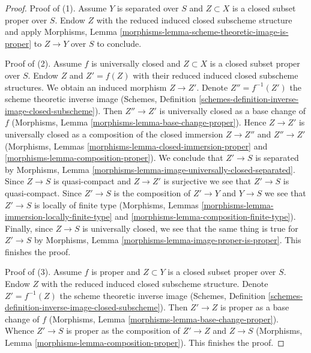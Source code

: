 \documentclass[10pt,a4paper]{amsart}
\theoremstyle{plain}
\theoremstyle{definition}
\theoremstyle{remark}
\numberwithin{equation}{subsection}
\begin{document}
\begin{proof}
Proof of (1). Assume $Y$ is separated over $S$ and $Z \subset X$
is a closed subset proper over $S$. Endow $Z$ with the reduced induced
closed subscheme structure and apply
Morphisms, Lemma \ref{morphisms-lemma-scheme-theoretic-image-is-proper}
to $Z \to Y$ over $S$ to conclude.

\medskip\noindent
Proof of (2). Assume $f$ is universally closed and $Z \subset X$ is a
closed subset proper over $S$. Endow $Z$ and $Z' = f(Z)$ with their reduced
induced closed subscheme structures. We obtain an induced
morphism $Z \to Z'$.
Denote $Z'' = f^{-1}(Z')$ the scheme theoretic inverse image
(Schemes, Definition \ref{schemes-definition-inverse-image-closed-subscheme}).
Then $Z'' \to Z'$ is universally closed as a base change of $f$
(Morphisms, Lemma \ref{morphisms-lemma-base-change-proper}).
Hence $Z \to Z'$ is universally closed as a composition of
the closed immersion $Z \to Z''$ and $Z'' \to Z'$
(Morphisms, Lemmas
\ref{morphisms-lemma-closed-immersion-proper} and
\ref{morphisms-lemma-composition-proper}).
We conclude that $Z' \to S$ is separated by
Morphisms, Lemma \ref{morphisms-lemma-image-universally-closed-separated}.
Since $Z \to S$ is quasi-compact and $Z \to Z'$ is surjective
we see that $Z' \to S$ is quasi-compact.
Since $Z' \to S$ is the composition of $Z' \to Y$ and $Y \to S$
we see that $Z' \to S$ is locally of finite type
(Morphisms, Lemmas \ref{morphisms-lemma-immersion-locally-finite-type} and
\ref{morphisms-lemma-composition-finite-type}).
Finally, since $Z \to S$ is universally closed, we see that
the same thing is true for $Z' \to S$ by
Morphisms, Lemma \ref{morphisms-lemma-image-proper-is-proper}.
This finishes the proof.

\medskip\noindent
Proof of (3). Assume $f$ is proper and $Z \subset Y$ is a closed subset
proper over $S$. Endow $Z$ with the reduced induced closed subscheme
structure. Denote $Z' = f^{-1}(Z)$ the scheme theoretic inverse image
(Schemes, Definition \ref{schemes-definition-inverse-image-closed-subscheme}).
Then $Z' \to Z$ is proper as a base change of $f$
(Morphisms, Lemma \ref{morphisms-lemma-base-change-proper}).
Whence $Z' \to S$ is proper as the composition of $Z' \to Z$
and $Z \to S$
(Morphisms, Lemma \ref{morphisms-lemma-composition-proper}).
This finishes the proof.
\end{proof}
\end{document}
